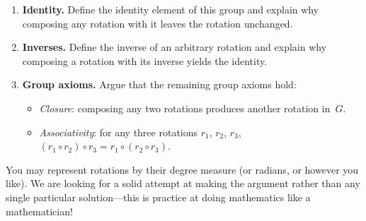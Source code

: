 \documentclass[11pt]{article}
\begin{document}
\begin{enumerate}[label=\textbf{(\alph*)},itemsep=6pt]
  \item \textbf{Identity.}  Define the identity element of this
        group and explain why composing any rotation with it
        leaves the rotation unchanged.

  \item \textbf{Inverses.}  Define the inverse of an arbitrary
        rotation and explain why composing a rotation with its
        inverse yields the identity.

  \item \textbf{Group axioms.}  Argue that the remaining group
        axioms hold:
        \begin{itemize}[itemsep=2pt]
          \item \emph{Closure}: composing any two rotations
                produces another rotation in~$G$.
          \item \emph{Associativity}: for any three rotations
                $r_1$, $r_2$, $r_3$,
                $(r_1 \circ r_2) \circ r_3
                 = r_1 \circ (r_2 \circ r_3)$.
        \end{itemize}
\end{enumerate}

\medskip\noindent
You may represent rotations by their degree measure (or
radians, or however you like).  We are looking for a solid
attempt at making the argument rather than any single particular
solution---this is practice at doing mathematics like a
mathematician!
\end{document}
